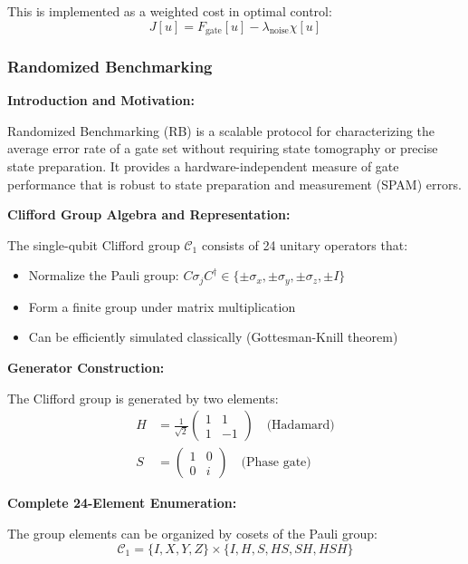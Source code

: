 \documentclass[11pt,a4paper]{article}
\theoremstyle{definition}
\theoremstyle{remark}
\begin{document}
This is implemented as a weighted cost in optimal control:
\begin{equation}
J[u] = F_{\text{gate}}[u] - \lambda_{\text{noise}}\chi[u]
\end{equation}

\subsubsection{Randomized Benchmarking}

\textbf{Introduction and Motivation:}

Randomized Benchmarking (RB) is a scalable protocol for characterizing the average error rate of a gate set without requiring state tomography or precise state preparation. It provides a hardware-independent measure of gate performance that is robust to state preparation and measurement (SPAM) errors.

\textbf{Clifford Group Algebra and Representation:}

The single-qubit Clifford group $\mathcal{C}_1$ consists of 24 unitary operators that:
\begin{itemize}
    \item Normalize the Pauli group: $C \sigma_j C^\dagger \in \{\pm\sigma_x, \pm\sigma_y, \pm\sigma_z, \pm I\}$
    \item Form a finite group under matrix multiplication
    \item Can be efficiently simulated classically (Gottesman-Knill theorem)
\end{itemize}

\textbf{Generator Construction:}

The Clifford group is generated by two elements:
\begin{align}
H &= \frac{1}{\sqrt{2}}\begin{pmatrix} 1 & 1 \\ 1 & -1 \end{pmatrix} \quad \text{(Hadamard)} \\
S &= \begin{pmatrix} 1 & 0 \\ 0 & i \end{pmatrix} \quad \text{(Phase gate)}
\end{align}

\textbf{Complete 24-Element Enumeration:}

The group elements can be organized by cosets of the Pauli group:
\begin{equation}
\mathcal{C}_1 = \{I, X, Y, Z\} \times \{I, H, S, HS, SH, HSH\}
\end{equation}
\end{document}

